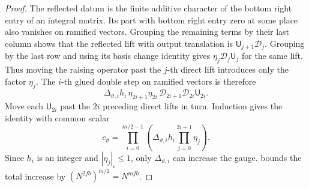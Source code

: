 \begin{proof}
The reflected datum is the finite additive character of the bottom right entry of an integral matrix. Its part with bottom right entry zero at some place also vanishes on ramified vectors. Grouping the remaining terms by their last column shows that the reflected lift with output translation is $\mathsf U_{j+1}\mathcal D_j$. Grouping by the last row and using its basis change identity gives $\eta_j\mathcal D_j\mathsf U_j$ for the same lift. Thus moving the raising operator past the $j$-th direct lift introduces only the factor $\eta_j$. The $i$-th glued double step on ramified vectors is therefore
\[
 \Delta_{\vartheta,i}h_i\,\eta_{2i+1}\eta_{2i}\,
    \mathcal D_{2i+1}\mathcal D_{2i}\mathsf U_{2i}.
\]
Move each $\mathsf U_{2i}$ past the $2i$ preceding direct lifts in turn. Induction gives the identity with common scalar
\[
 c_\vartheta
 =\prod_{i=0}^{m/2-1}\left(
   \Delta_{\vartheta,i}h_i\prod_{j=0}^{2i+1}\eta_j\right).
\]
Since $h_i$ is an integer and $|\eta_j|_\iota\le1$, only $\Delta_{\vartheta,i}$ can increase the gauge.  bounds the total increase by $(N^{2fb})^{m/2}=N^{mfb}$.
\end{proof}

